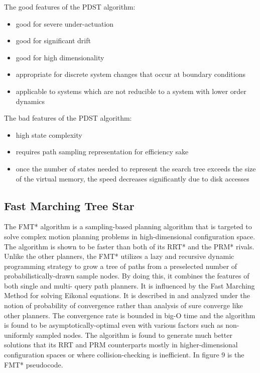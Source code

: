 \documentclass[conference]{IEEEtran} \usepackage[T1]{fontenc} \usepackage[backend=biber, style=ieee]{biblatex}
\begin{document}
The good features of the PDST algorithm:
\begin{itemize}
 \item good for severe under-actuation
 \item good for significant drift
 \item good for high dimensionality
 \item appropriate for discrete system changes that occur at boundary conditions
 \item applicable to systems which are not reducible to a system with lower order dynamics
\end{itemize}

The bad features of the PDST algorithm:
\begin{itemize}
 \item high state complexity
 \item requires path sampling representation for efficiency sake
 \item once the number of states needed to represent the search tree exceeds the size of the virtual memory, the speed decreases significantly due to disk accesses
\end{itemize}

\subsection{Fast Marching Tree Star} \label{FMT*}
The FMT* algorithm is a sampling-based planning algorithm that is targeted to solve complex motion planning problems in high-dimensional configuration space. The
algorithm is shown to be faster than both of its RRT* and the PRM* rivals. Unlike the other planners, the FMT* utilizes a lazy and recursive dynamic programming 
strategy to grow a tree of paths from a preselected number of probabilistically-drawn sample nodes. By doing this, it combines the features of both single and multi-
query path planners. It is influenced by the Fast Marching Method for solving Eikonal equations. It is described in \cite{fmt_star} and analyzed under the
notion of probability of convergence rather than analysis of sure converge like other planners. The convergence rate is bounded in big-O time and the algorithm
is found to be asymptotically-optimal even with various factors such as non-uniformly sampled nodes. The algorithm is found to generate much better solutions
that its RRT and PRM counterparts mostly in higher-dimensional configuration spaces or where collision-checking is inefficient. In figure 9 is the FMT* pseudocode.
\end{document}
